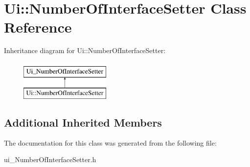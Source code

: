 \hypertarget{class_ui_1_1_number_of_interface_setter}{\section{Ui\-:\-:Number\-Of\-Interface\-Setter Class Reference}
\label{class_ui_1_1_number_of_interface_setter}
}
Inheritance diagram for Ui\-:\-:Number\-Of\-Interface\-Setter\-:\begin{figure}[H]
\begin{center}
\leavevmode
\includegraphics[height=2.000000cm]{class_ui_1_1_number_of_interface_setter}
\end{center}
\end{figure}
\subsection*{Additional Inherited Members}


The documentation for this class was generated from the following file\-:\begin{DoxyCompactItemize}
\item 
ui\-\_\-\-Number\-Of\-Interface\-Setter.\-h\end{DoxyCompactItemize}

